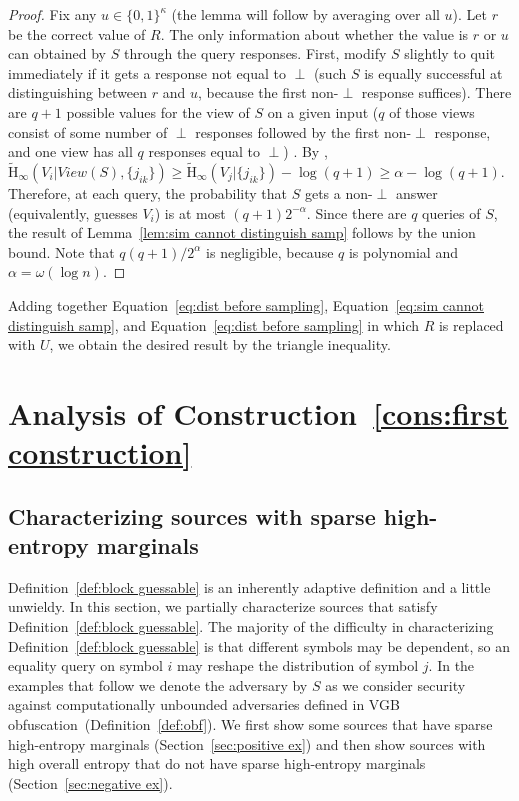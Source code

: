 \documentclass[11pt]{article}
\newcommand{\secref}[1]{\mbox{Section~\ref{#1}}}
\newcommand{\defref}[1]{\mbox{Definition~\ref{#1}}}
\newcommand{\lemref}[1]{\mbox{Lemma~\ref{#1}}}
\newcommand{\consref}[1]{\mbox{Construction~\ref{#1}}}
\newcommand{\zo}{\ensuremath{\{0, 1\}}}
\newcommand{\Hav}{\tilde{\mathrm{H}}_\infty}
\newcommand{\subsetEntropy}{\alpha}
\begin{document}
\begin{proof}
Fix any $u\in \zo^\kappa$ (the lemma will follow by averaging over all $u$). Let $r$ be the correct value of $R$.
The only information about whether the value is $r$ or $u$ can obtained by $S$ through the query responses. First, modify $S$ slightly to quit immediately if it gets a response not equal to $\perp$ (such $S$ is equally successful at distinguishing between $r$ and $u$, because the first non-$\perp$ response suffices). There are $q+1$ possible values for the view of $S$ on a given input ($q$ of those views consist of some number of $\perp$ responses followed by the first non-$\perp$ response, and one view has all $q$ responses equal to $\perp$) . By \cite[Lemma 2.2b]{DBLP:journals/siamcomp/DodisORS08}, $\Hav(V_i | View(S), \{j_{ik}\}) \ge \Hav(V_j | \{j_{ik}\}) - \log (q+1) \ge \subsetEntropy - \log(q+1)$. Therefore, at each query, the probability that $S$ gets a non-$\perp$ answer (equivalently, guesses $V_i$) is at most $(q+1)2^{-\subsetEntropy}$. Since there are $q$ queries of $S$, the result of \lemref{lem:sim cannot distinguish samp} follows by the union bound. Note that  $q(q+1)/2^\subsetEntropy$ is negligible, because $q$ is polynomial and $\subsetEntropy=\omega(\log n)$.
\end{proof}

Adding together Equation~\ref{eq:dist before sampling}, Equation~\ref{eq:sim cannot distinguish samp}, and Equation~\ref{eq:dist before sampling} in which $R$ is replaced with $U$, we obtain the desired result by the triangle inequality.\section{Analysis of \consref{cons:first construction}}
\label{sec:construction analysis}

\subsection{Characterizing sources with sparse high-entropy marginals}
\label{sec:characterize}

\defref{def:block guessable} is an inherently adaptive definition and a little unwieldy.  In this section, we partially characterize sources that satisfy \defref{def:block guessable}.
The majority of the difficulty in characterizing \defref{def:block guessable} is that different symbols may be dependent, so an equality query on symbol $i$ may reshape the distribution of symbol $j$.  In the examples that follow we denote the adversary by $S$ as we consider security against computationally unbounded adversaries defined in VGB obfuscation~(\defref{def:obf}).  We first show some sources that have sparse high-entropy marginals
\ifnum{}
(\secref{sec:positive ex})
\fi
and then show sources with high overall entropy that do not have sparse high-entropy marginals
\ifnum{}
(\secref{sec:negative ex}).
\fi
\end{document}
